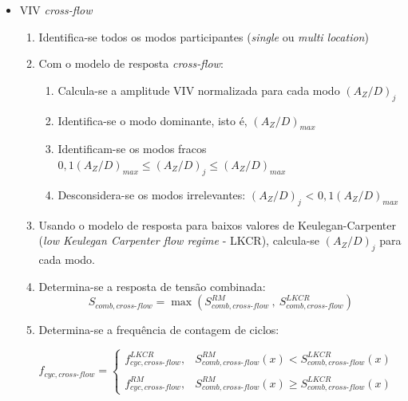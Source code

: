 \begin{itemize}
    
\item VIV \textit{cross-flow}\label{procedure_il}

\begin{enumerate}
\item Identifica-se todos os modos participantes (\textit{single} ou \textit{multi location})

\item Com o modelo de resposta \textit{cross-flow}:
	\begin{enumerate}
    \item Calcula-se a amplitude VIV normalizada para cada modo $(A_Z/D)_j$

	\item Identifica-se o modo dominante, isto é, $(A_Z/D)_\mathit{max}$

    \item Identificam-se os modos fracos $0,1(A_Z/D)_\mathit{max} \leq (A_Z/D)_j \leq (A_Z/D)_\mathit{max}$
    
    \item Desconsidera-se os modos irrelevantes: $(A_Z/D)_j$ < $0,1(A_Z/D)_\mathit{max}$
    \end{enumerate}

\item Usando o modelo de resposta para baixos valores de Keulegan-Carpenter (\textit{low Keulegan Carpenter flow regime} - LKCR), calcula-se $(A_Z/D)_j$ para cada modo.

\item Determina-se a resposta de tensão combinada:
    $$
    S_{\mathit{comb}, \mathit{\textit{cross-flow}}} = \max\left( S_{\mathit{comb}, \mathit{\textit{cross-flow}}}^\mathit{RM} ~,~ S_{\mathit{comb}, \mathit{\textit{cross-flow}}}^\mathit{LKCR} \right)
    $$

\item Determina-se a frequência de contagem de ciclos:

    $$
    f_{\mathit{cyc}, \mathit{\textit{cross-flow}}} =
    \left\{
    \begin{matrix}
    f_{\mathit{cyc}, \mathit{\textit{cross-flow}}}^\mathit{LKCR}, & S_{\mathit{comb},\mathit{\textit{cross-flow}}}^\mathit{RM}(x)    < S_{\mathit{comb},\mathit{\textit{cross-flow}}}^\mathit{LKCR}(x) & \\
    \\
    f_{\mathit{cyc}, \mathit{\textit{cross-flow}}}^\mathit{RM},   & S_{\mathit{comb},\mathit{\textit{cross-flow}}}^\mathit{RM}(x) \geq S_{\mathit{comb},\mathit{\textit{cross-flow}}}^\mathit{LKCR}(x)
    \end{matrix}
    \right.
    $$


\end{enumerate}
\end{itemize}

